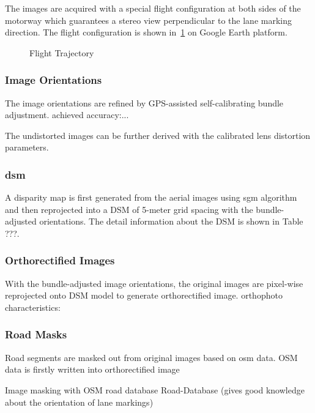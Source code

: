 \clearpage

The images are acquired with a special flight configuration at both sides of the motorway which guarantees a stereo view perpendicular to the lane marking direction. The flight configuration is shown in~\cref{fig:FlightTrajectory} on Google Earth platform.

\begin{figure}[!h]
  \centering
  \caption{Flight Trajectory}
  \label{fig:FlightTrajectory}
\end{figure}


\subsubsection{Image Orientations}
The image orientations are refined by GPS-assisted self-calibrating bundle adjustment.
achieved accuracy:...


The undistorted images can be further derived with the calibrated lens distortion parameters.


\subsubsection{\gls{dsm}}
A disparity map is first generated from the aerial images using \gls{sgm} algorithm and then reprojected into a DSM of 5-meter grid spacing with the bundle-adjusted orientations. The detail information about the DSM is shown in Table ???.

\subsubsection{Orthorectified Images}
With the bundle-adjusted image orientations, the original images are pixel-wise reprojected onto DSM model to generate orthorectified image. 
orthophoto characteristics:


\subsubsection{Road Masks}
Road segments are masked out from original images based on \gls{osm} data.
OSM data is firstly written into orthorectified image

Image masking with OSM road database
Road-Database (gives good knowledge about the orientation of lane markings)


